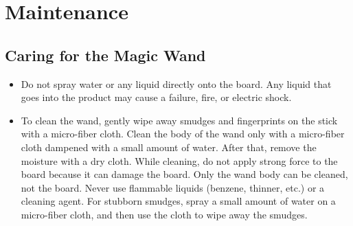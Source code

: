 \section{Maintenance}

\subsection{Caring for the Magic Wand}

	\begin{itemize}
		\item Do not spray water or any liquid directly onto the board. Any liquid that goes into the product may cause a failure, fire, or electric shock.
		\item To clean the wand, gently wipe away smudges and fingerprints on the stick with a micro-fiber cloth. Clean the body of the wand only with a micro-fiber cloth dampened with a small amount of water. After that, remove the moisture with a dry cloth. While cleaning, do not apply strong force to the board because it can damage the board. Only the wand body can be cleaned, not the board. Never use flammable liquids (benzene, thinner, etc.) or a cleaning agent. For stubborn smudges, spray a small amount of water on a micro-fiber cloth, and then use the cloth to wipe away the smudges.
	\end{itemize}

